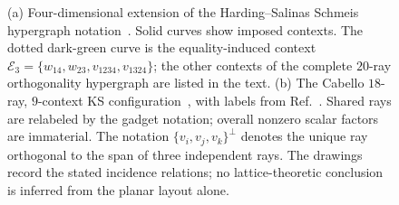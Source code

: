 \documentclass[%
  reprint,
  superscriptaddress,
  showpacs,
  showkeys,
  amsmath,amssymb,
  pra,
  longbibliography,
  floatfix,
  x11names
]{revtex4-2}
\newcommand{\rev}[1]{{\color{revisionblue}#1}}
\begin{document}
\begin{figure}[ht]
\begin{tabular}{ccc}

\end{tabular}
\caption{
\rev{(a) Four-dimensional extension of the Harding--Salinas Schmeis hypergraph notation~\cite{harding2025remarksIJTP}.  Solid curves show imposed contexts.  The dotted dark-green curve is the equality-induced context $\mathcal{E}_3=\{w_{14},w_{23},v_{1234},v_{1324}\}$; the other contexts of the complete $20$-ray orthogonality hypergraph are listed in the text.  (b) The Cabello $18$-ray, $9$-context KS configuration~\cite{cabello-96}, with labels from Ref.~\cite{cabello:210401}.  Shared rays are relabeled by the gadget notation; overall nonzero scalar factors are immaterial.  The notation $\{v_i,v_j,v_k\}^{\perp}$ denotes the unique ray orthogonal to the span of three independent rays.  The drawings record the stated incidence relations; no lattice-theoretic conclusion is inferred from the planar layout alone.}
}
\label{fig:peres}
\end{figure}
\end{document}
